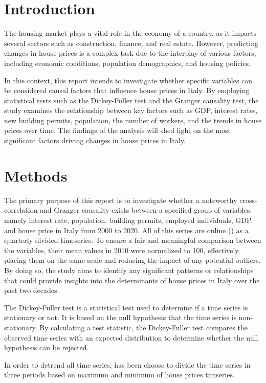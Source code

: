\documentclass[a4paper,11pt,rmp,superscriptaddress]{report}
\begin{document}
\section*{Introduction}
The housing market plays a vital role in the economy of a country, as it impacts several sectors such as construction, 
finance, and real estate. However, predicting changes in house prices is a complex task due to the interplay of various factors, 
including economic conditions, population demographics, and housing policies. 

In this context, this report intends to investigate whether specific variables can be considered causal factors that influence house 
prices in Italy. By employing statistical tests such as the Dickey-Fuller test and the Granger causality test, the study examines 
the relationship between key factors such as GDP, interest rates, new building permits, population, the number of workers, 
and the trends in house prices over time. The findings of the analysis will shed light on the most significant factors driving changes 
in house prices in Italy.

\section*{Methods}
The primary purpose of this report is to investigate whether a noteworthy cross-correlation and Granger 
causality exists between a specified group of variables, namely interest rate, population, building permits, 
employed individuals, GDP, and house price in Italy from 2000 to 2020. All of this series are online () 
as a quarterly divided timeseries. To ensure a fair and meaningful comparison between the variables, 
their mean values in 2010 were normalized to 100, effectively placing them on the same scale and reducing the impact of any potential 
outliers. By doing so, the study aims to identify any significant patterns or relationships that could provide insights into the 
determinants of house prices in Italy over the past two decades.

The Dickey-Fuller test is a statistical test used to determine if a time series is stationary or not. 
It is based on the null hypothesis that the time series  is non-stationary. By calculating a test statistic, the Dickey-Fuller test 
compares the observed time series with an expected distribution to determine whether the null hypothesis can be rejected. 

In order to detrend all time series, has been choose to divide the time series in three periods based on maximum and minimum 
of house prices timseries.
\end{document}

